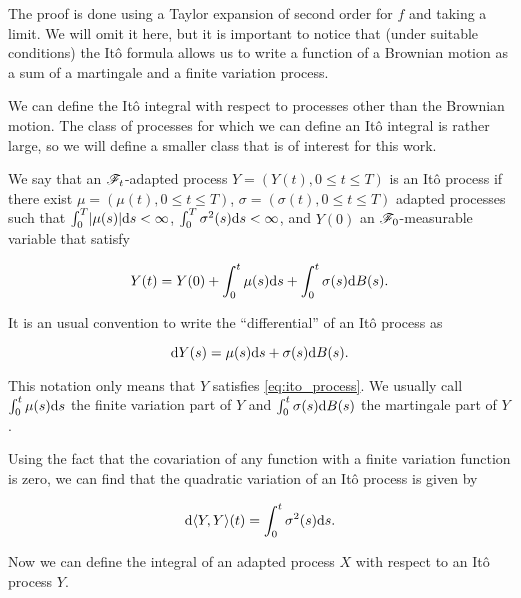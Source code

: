 The proof is done using a Taylor expansion of second order for $f$ and taking a limit. We will omit it here, but it is important to notice that (under suitable conditions) the Itô formula allows us to write a function of a Brownian motion as a sum of a martingale and a finite variation process.

We can define the Itô integral with respect to processes other than the Brownian motion. The class of processes for which we can define an Itô integral is rather large, so we will define a smaller class that is of interest for this work.

\begin{definition}
    We say that an $\mathscr F_t$-adapted process $Y = (Y(t), 0 \le t \le T)$ is an Itô process if there exist $\mu = (\mu(t), 0 \le t \le T)$, $\sigma = (\sigma(t), 0 \le t \le T)$ adapted processes such that $\int_0^T \lvert \mu(s) \rvert\mathrm d s < \infty$, $\int_0^T \sigma^2(s) \mathrm d s < \infty$, and $Y(0)$ an $\mathscr F_0$-measurable variable that satisfy 

    \begin{equation} \label{eq:ito_process}
        Y(t) = Y(0) + \int_0^t \mu(s) \mathrm d s + \int_0^t \sigma(s) \mathrm d B(s).
    \end{equation}
\end{definition}

It is an usual convention to write the ``differential'' of an Itô process as

 \begin{equation*}
    \mathrm d Y(s) = \mu(s) \mathrm d s + \sigma(s) \mathrm d B(s).
 \end{equation*}

 This notation only means that $Y$ satisfies \eqref{eq:ito_process}. We usually call $\int_0^t \mu(s) \mathrm d s$ the finite variation part of $Y$ and $\int_0^t \sigma(s) \mathrm d B(s)$ the martingale part of $Y$. 

 Using the fact that the covariation of any function with a finite variation function is zero, we can find that the quadratic variation of an Itô process is given by

 \begin{equation*}
    \mathrm d \langle Y, Y \rangle(t) = \int_0^t \sigma^2 (s) \mathrm d s.
 \end{equation*}

 Now we can define the integral of an adapted process $X$ with respect to an Itô process $Y$. 

